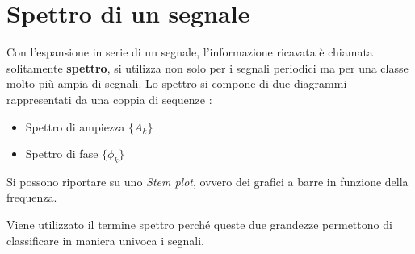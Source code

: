 \section{Spettro di un segnale}
Con l'espansione in serie di un segnale, l'informazione ricavata è chiamata
solitamente \textbf{spettro}, si utilizza non solo per i segnali periodici ma
per una classe molto più ampia di segnali.
Lo spettro si compone di due diagrammi rappresentati da una coppia di sequenze :
\begin{itemize}
 \item Spettro di ampiezza $\{A_k\} $
 \item Spettro di fase $\{\phi_k\}$
\end{itemize}

Si possono riportare su uno \textit{Stem plot}, ovvero dei grafici a barre in
funzione della frequenza.

Viene utilizzato il termine spettro perché queste due grandezze permettono di
classificare in maniera univoca i segnali.
